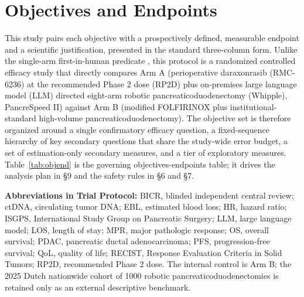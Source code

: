 \section{Objectives and Endpoints}

This study pairs each objective with a prospectively defined, measurable endpoint
and a scientific justification, presented in the standard three-column form. Unlike
the single-arm first-in-human predicate \cite{kawchak2026phase1}, this protocol is
a randomized controlled efficacy study that directly compares Arm A (perioperative
daraxonrasib (RMC-6236) at the recommended Phase 2 dose (RP2D) plus on-premises
large language model (LLM) directed eight-arm robotic pancreaticoduodenectomy
(Whipple), PancreSpeed II) against Arm B (modified FOLFIRINOX
\cite{Conroy2018} plus institutional-standard high-volume pancreaticoduodenectomy).
The objective set is therefore organized around a single confirmatory efficacy
question, a fixed-sequence hierarchy of key secondary questions that share the
study-wide error budget, a set of estimation-only secondary measures, and a tier
of exploratory measures. Table~\ref{tab:objend} is the governing objectives-endpoints
table; it drives the analysis plan in \S9 and the safety rules in \S6 and \S7.

\noindent \textbf{Abbreviations in Trial Protocol:} BICR, blinded independent
central review; ctDNA, circulating tumor DNA; EBL, estimated blood loss; HR,
hazard ratio; ISGPS, International Study Group on Pancreatic Surgery; LLM, large
language model; LOS, length of stay; MPR, major pathologic response; OS, overall
survival; PDAC, pancreatic ductal adenocarcinoma; PFS, progression-free survival;
QoL, quality of life; RECIST, Response Evaluation Criteria in Solid Tumors; RP2D,
recommended Phase 2 dose. The internal control is Arm B; the 2025 Dutch nationwide
cohort of 1000 robotic pancreaticoduodenectomies \cite{DutchCohort2025} is retained
only as an external descriptive benchmark.

\vspace{0.3em}

